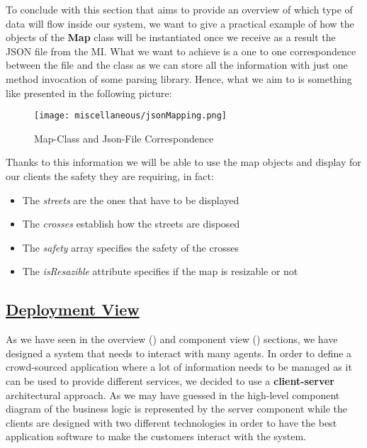 		\FloatBarrier
		
		To conclude with this section that aims to provide an overview of which type of data will flow inside our system, we want to give a practical example of how the objects of the \textbf{Map} class will be instantiated once we receive as a result the JSON file from the MI. What we want to achieve is a one to one correspondence between the file and the class as we can store all the information with just one method invocation of some parsing library. Hence, what we aim to is something like presented in the following picture:
		
		\begin{figure}[h!]
			\centering
			\texttt{[image: miscellaneous/jsonMapping.png]}
			\caption{\label{fig:jsonMapping} Map-Class and Json-File Correspondence}
		\end{figure}
	
		Thanks to this information we will be able to use the map objects and display for our clients the safety they are requiring, in fact:
		
		\begin{itemize}
			\item The \emph{streets} are the ones that have to be displayed
			\item The \emph{crosses} establish how the streets are disposed
			\item The \emph{safety} array specifies the safety of the crosses
			\item The \emph{isResazible} attribute specifies if the map is resizable or not
		\end{itemize}
	
		\newpage
	
	\subsection[Deployment View]{\hyperlink{toc}{Deployment View}}
		\label{sec:deploymentView}

		As we have seen in the overview () and component view () sections, we have designed a system that needs to interact with many agents. In order to define a crowd-sourced application where a lot of information needs to be managed as it can be used to provide different services, we decided to use a \textbf{client-server} architectural approach. As we may have guessed in the high-level component diagram of  the business logic is represented by the server component while the clients are designed with two different technologies in order to have the best application software to make the customers interact with the system.\\
		

